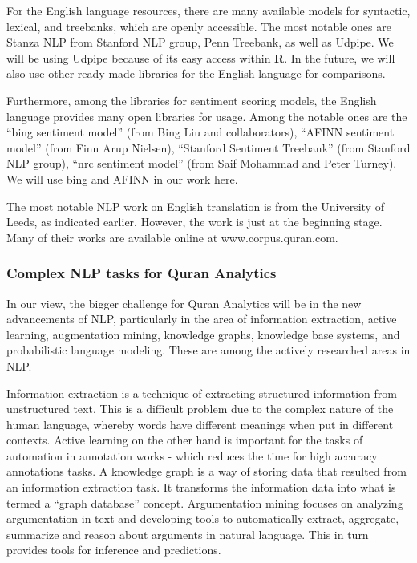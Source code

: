 \documentclass[
]{article}
\begin{document}
For the English language resources, there are many available models for syntactic, lexical, and treebanks, which are openly accessible. The most notable ones are Stanza NLP from Stanford NLP group, Penn Treebank, as well as Udpipe. We will be using Udpipe because of its easy access within \textbf{R}. In the future, we will also use other ready-made libraries for the English language for comparisons.

Furthermore, among the libraries for sentiment scoring models, the English language provides many open libraries for usage. Among the notable ones are the ``bing sentiment model'' (from Bing Liu and collaborators), ``AFINN sentiment model'' (from Finn Arup Nielsen), ``Stanford Sentiment Treebank'' (from Stanford NLP group), ``nrc sentiment model'' (from Saif Mohammad and Peter Turney). We will use bing and AFINN in our work here.

The most notable NLP work on English translation is from the University of Leeds, as indicated earlier. However, the work is just at the beginning stage. Many of their works are available online at www.corpus.quran.com.

\hypertarget{complex-nlp-tasks-for-quran-analytics}{%
\subsubsection{Complex NLP tasks for Quran Analytics}\label{complex-nlp-tasks-for-quran-analytics}}

In our view, the bigger challenge for Quran Analytics will be in the new advancements of NLP, particularly in the area of information extraction, active learning, augmentation mining, knowledge graphs, knowledge base systems, and probabilistic language modeling. These are among the actively researched areas in NLP.

Information extraction is a technique of extracting structured information from unstructured text. This is a difficult problem due to the complex nature of the human language, whereby words have different meanings when put in different contexts. Active learning on the other hand is important for the tasks of automation in annotation works - which reduces the time for high accuracy annotations tasks. A knowledge graph is a way of storing data that resulted from an information extraction task. It transforms the information data into what is termed a ``graph database'' concept. Argumentation mining focuses on analyzing argumentation in text and developing tools to automatically extract, aggregate, summarize and reason about arguments in natural language. This in turn provides tools for inference and predictions.
\end{document}
